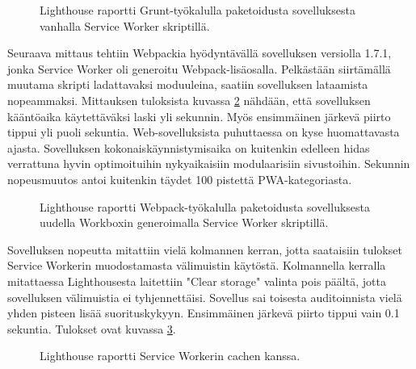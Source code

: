 \documentclass{tktltiki}
\begin{document}
\begin{figure}[h]
\begin{center}
\caption{Lighthouse raportti Grunt-työkalulla paketoidusta sovelluksesta vanhalla Service Worker skriptillä.}
\label{Lighthouse raportti 1}
\end{center}
\end{figure}

\clearpage

Seuraava mittaus tehtiin Webpackia hyödyntävällä sovelluksen versiolla 1.7.1, jonka Service Worker oli generoitu Webpack-lisäosalla. Pelkästään siirtämällä muutama skripti ladattavaksi moduuleina, saatiin sovelluksen lataamista nopeammaksi. Mittauksen tuloksista kuvassa \ref{Lighthouse raportti 2} nähdään, että sovelluksen kääntöaika käytettäväksi laski yli sekunnin. Myös ensimmäinen järkevä piirto tippui yli puoli sekuntia. Web-sovelluksista puhuttaessa on kyse huomattavasta ajasta. Sovelluksen kokonaiskäynnistymisaika on kuitenkin edelleen hidas verrattuna hyvin optimoituihin nykyaikaisiin modulaarisiin sivustoihin. Sekunnin nopeusmuutos antoi kuitenkin täydet 100 pistettä PWA-kategoriasta. 

\begin{figure}[h]
\begin{center}
\caption{Lighthouse raportti Webpack-työkalulla paketoidusta sovelluksesta uudella Workboxin generoimalla Service Worker skriptillä.}
\label{Lighthouse raportti 2}
\end{center}
\end{figure}

\clearpage

Sovelluksen nopeutta mitattiin vielä kolmannen kerran, jotta saataisiin tulokset Service Workerin muodostamasta välimuistin käytöstä. Kolmannella kerralla mitattaessa Lighthousesta laitettiin "Clear storage" valinta pois päältä, jotta sovelluksen välimuistia ei tyhjennettäisi. Sovellus sai toisesta auditoinnista vielä yhden pisteen lisää suorituskykyyn. Ensimmäinen järkevä piirto tippui vain 0.1 sekuntia. Tulokset ovat kuvassa \ref{Lighthouse raportti 3}.

\begin{figure}[h]
\begin{center}
\caption{Lighthouse raportti Service Workerin cachen kanssa.}
\label{Lighthouse raportti 3}
\end{center}
\end{figure}
\end{document}

